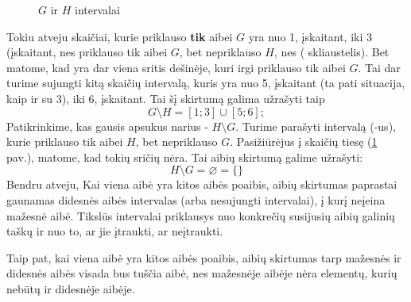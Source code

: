 \documentclass[a4paper]{article}
\newcommand{\germanqq}[1]{{\selectlanguage{german}\glqq#1\grqq\selectlanguage{english}}}
\begin{document}
\begin{figure}[!htbp]
      \centering
      \caption{$G$ ir $H$ intervalai}\label{fig:set_difference_number_line_3}
\end{figure}

Tokiu atveju skaičiai, kurie priklauso \textbf{tik} aibei $G$ yra nuo 1,
įskaitant, iki 3 (įskaitant, nes priklauso tik aibei $G$, bet nepriklauso $H$,
nes \germanqq{(} skliaustelis). Bet matome, kad yra dar viena sritis dešinėje,
kuri irgi priklauso tik aibei $G$. Tai dar turime sujungti kitą skaičių
intervalą, kuris yra nuo 5, įskaitant (ta pati situacija, kaip ir su 3), iki
6, įskaitant. Tai šį skirtumą galima užrašyti taip
\[G \setminus H = [1;3] \cup [5;6];\]
Patikrinkime, kas gausis apsukus narius - $ H \setminus G $. Turime parašyti
intervalą (-us), kurie priklauso tik aibei $H$, bet nepriklauso $G$.
Pasižiūrėjus į skaičių tiesę (\ref{fig:set_difference_number_line_3} pav.),
matome, kad tokių sričių nėra. Tai aibių skirtumą galime užrašyti:
\[H \setminus G = \varnothing = \{\} \]
Bendru atveju, Kai viena aibė yra kitos aibės poaibis, aibių skirtumas
paprastai gaunamas didesnės aibės intervalas (arba nesujungti intervalai), į
kurį neįeina mažesnė aibė. Tikslūs intervalai priklausys nuo konkrečių
susijusių aibių galinių taškų ir nuo to, ar jie įtraukti, ar neįtraukti.

Taip pat, kai viena aibė yra kitos aibės poaibis, aibių skirtumas tarp mažesnės
ir didesnės aibės visada bus tuščia aibė, nes mažesnėje aibėje nėra elementų,
kurių nebūtų ir didesnėje aibėje.

\clearpage



\end{document}
